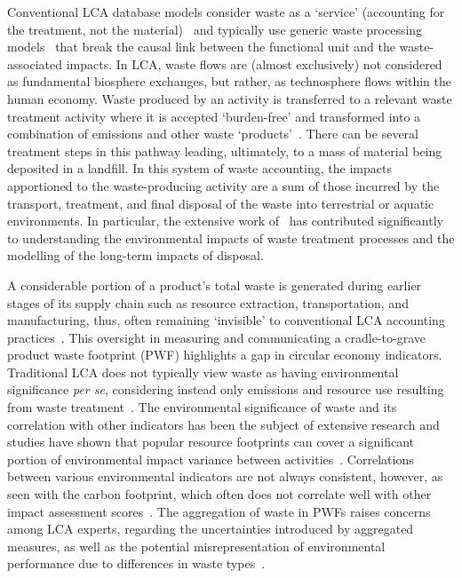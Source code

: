 Conventional LCA database models consider waste as a `service' (accounting for the treatment, not the material)~\citep{guinee2021wasteisnotaservice} and typically use generic waste processing models~\citep{beylot2018} that break the causal link between the functional unit and the waste-associated impacts. In LCA, waste flows are (almost exclusively) not considered as fundamental biosphere exchanges, but rather, as technosphere flows within the human economy. Waste produced by an activity is transferred to a relevant waste treatment activity where it is accepted `burden-free' and transformed into a combination of emissions and other waste `products'~\citep{guinee2021wasteisnotaservice}. There can be several treatment steps in this pathway leading, ultimately, to a mass of material being deposited in a landfill. In this system of waste accounting, the impacts apportioned to the waste-producing activity are a sum of those incurred by the transport, treatment, and final disposal of the waste into terrestrial or aquatic environments. In particular, the extensive work of~\cite{doka2024publications} has contributed significantly to understanding the environmental impacts of waste treatment processes and the modelling of the long-term impacts of disposal.

A considerable portion of a product's total waste is generated during earlier stages of its supply chain such as resource extraction, transportation, and manufacturing, thus, often remaining `invisible' to conventional LCA accounting practices~\citep{laurenti2016wastefootprint}. This oversight in measuring and communicating a cradle-to-grave product waste footprint (PWF) highlights a gap in circular economy indicators. Traditional LCA does not typically view waste as having environmental significance \textit{per se}, considering instead only emissions and resource use resulting from waste treatment~\citep{bisinella2024wastelca, laurenti2023wastefootprint}. The environmental significance of waste and its correlation with other indicators has been the subject of extensive research and studies have shown that popular resource footprints can cover a significant portion of environmental impact variance between activities~\citep{steinmann2017resourcefootprints,laurenti2023wastefootprint}. Correlations between various environmental indicators are not always consistent, however, as seen with the carbon footprint, which often does not correlate well with other impact assessment scores~\citep{laurenti2012carbonfootprint}. The aggregation of waste in PWFs raises concerns among LCA experts, regarding the uncertainties introduced by aggregated measures, as well as the potential misrepresentation of environmental performance due to differences in waste types~\citep{chen2021methoduncertainty,huijbregts2010energyfootprint}.

